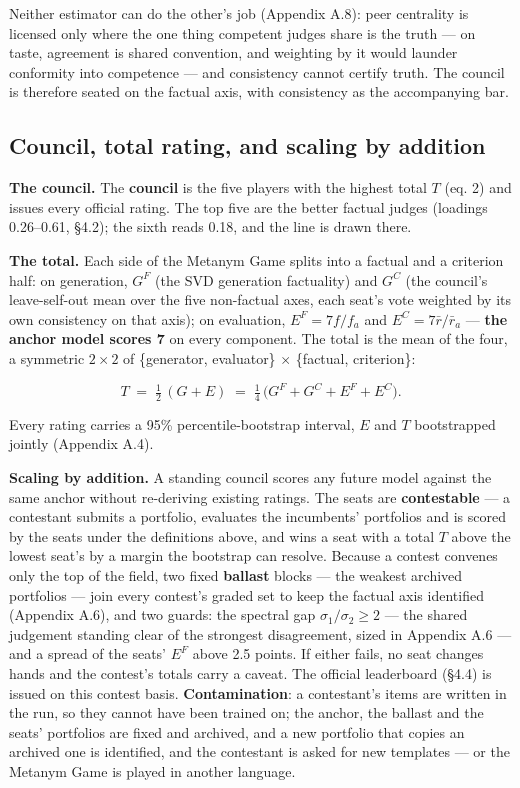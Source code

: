 \documentclass{article}
\begin{document}
Neither estimator can do the other's job (Appendix A.8): peer centrality is licensed only where the one thing competent judges share is the truth --- on taste, agreement is shared convention, and weighting by it would launder conformity into competence --- and consistency cannot certify truth. The council is therefore seated on the factual axis, with consistency as the accompanying bar.

\subsection{Council, total rating, and scaling by addition}\label{council-total-rating-and-scaling-by-addition}

\textbf{The council.} The \textbf{council} is the five players with the highest total \(T\) (eq. 2) and issues every official rating. The top five are the better factual judges (loadings 0.26--0.61, \S{}4.2); the sixth reads 0.18, and the line is drawn there.

\textbf{The total.} Each side of the Metanym Game splits into a factual and a criterion half: on generation, \(G^{F}\) (the SVD generation factuality) and \(G^{C}\) (the council's leave-self-out mean over the five non-factual axes, each seat's vote weighted by its own consistency on that axis); on evaluation, \(E^{F} = 7f/f_a\) and \(E^{C} = 7\bar r/\bar r_a\) --- \textbf{the anchor model scores 7} on every component. The total is the mean of the four, a symmetric \(2\times2\) of \{generator, evaluator\} \ensuremath{\times} \{factual, criterion\}:

\[T \;=\; \tfrac12\,(G+E) \;=\; \tfrac14\,\big(G^{F}+G^{C}+E^{F}+E^{C}\big). \tag{2}\]

Every rating carries a 95\% percentile-bootstrap interval, \(E\) and \(T\) bootstrapped jointly (Appendix A.4).

\textbf{Scaling by addition.} A standing council scores any future model against the same anchor without re-deriving existing ratings. The seats are \textbf{contestable} --- a contestant submits a portfolio, evaluates the incumbents' portfolios and is scored by the seats under the definitions above, and wins a seat with a total \(T\) above the lowest seat's by a margin the bootstrap can resolve. Because a contest convenes only the top of the field, two fixed \textbf{ballast} blocks --- the weakest archived portfolios --- join every contest's graded set to keep the factual axis identified (Appendix A.6), and two guards: the spectral gap \(\sigma_1/\sigma_2 \ge 2\) --- the shared judgement standing clear of the strongest disagreement, sized in Appendix A.6 --- and a spread of the seats' \(E^{F}\) above 2.5 points. If either fails, no seat changes hands and the contest's totals carry a caveat. The official leaderboard (\S{}4.4) is issued on this contest basis. \textbf{Contamination}: a contestant's items are written in the run, so they cannot have been trained on; the anchor, the ballast and the seats' portfolios are fixed and archived, and a new portfolio that copies an archived one is identified, and the contestant is asked for new templates --- or the Metanym Game is played in another language.
\end{document}
